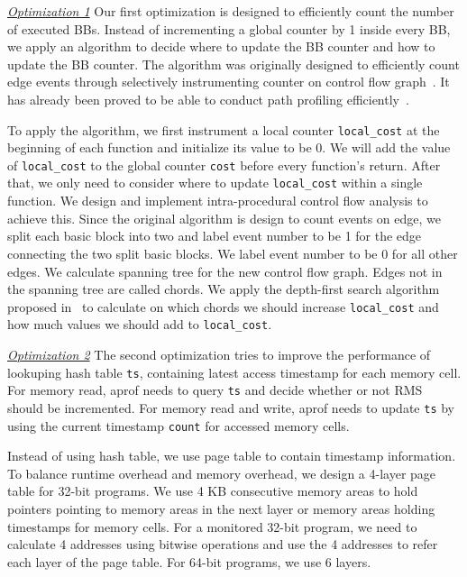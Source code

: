 {\underline{\textit{Optimization 1}}
Our first optimization is designed to efficiently count the number of executed BBs.
Instead of incrementing a global counter by 1 inside every BB,
we apply an algorithm to decide where to update the BB counter and how to update the BB counter. 
The algorithm was originally designed to 
efficiently count edge events through selectively instrumenting counter 
on control flow graph~\cite{event-counting}. 
It has already been proved to be able to conduct path 
profiling efficiently~\cite{peter-ase,path-profiling}.

To apply the algorithm, we first instrument a local counter 
\texttt{local\_cost} at the beginning of each function
and initialize its value to be 0. 
We will add the value of \texttt{local\_cost} to the 
global counter \texttt{cost} before 
every function's return.
After that, we only need to consider where to update \texttt{local\_cost} 
within a single function.
We design and implement intra-procedural 
control flow analysis to achieve this.
Since the original algorithm is design to count events on edge,
we split each basic block into two and label event number to be 1 
for the edge connecting the two split basic blocks.  
We label event number to be 0 for all other edges. 
We calculate spanning tree for the new control flow graph. 
Edges not in the spanning tree are called chords.
We apply the depth-first search algorithm proposed in~\cite{event-counting} 
to calculate on which chords we should increase 
\texttt{local\_cost} and how much values 
we should add to \texttt{local\_cost}.


{\underline{\textit{Optimization 2}}
The second optimization tries to improve the performance of 
lookuping hash table \texttt{ts}, 
containing latest access timestamp for each memory cell.
For memory read, 
aprof needs to query \texttt{ts} and decide 
whether or not RMS should be incremented.
For memory read and write, 
aprof needs to update \texttt{ts} by using the current timestamp \texttt{count}
for accessed memory cells. 

Instead of using hash table, 
we use page table to contain timestamp information. 
To balance runtime overhead and memory overhead, 
we design a 4-layer page table for 32-bit programs.
We use 4 KB consecutive memory areas to hold pointers pointing to 
memory areas in the next layer 
or memory areas holding timestamps for memory cells. 
For a monitored 32-bit program, 
we need to calculate 4 addresses using bitwise operations 
and use the 4 addresses to refer each layer of the page table.  
For 64-bit programs, we use 6 layers.  


}}
